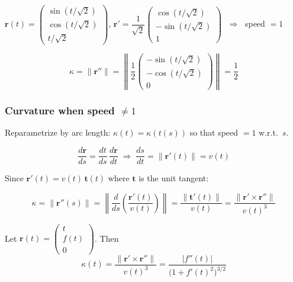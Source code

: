 \begin{example}
  $\mathbf{r}(t)
    =
    \begin{pmatrix}
      \sin(t/\!\sqrt{2}) \\ \cos(t/\!\sqrt{2}) \\ t/\!\sqrt{2}
    \end{pmatrix}
  $, \quad
  $\mathbf{r}'
    = \dfrac{1}{\sqrt{2}}
    \begin{pmatrix}
      \cos(t/\!\sqrt{2}) \\ -\sin(t/\!\sqrt{2}) \\ 1
    \end{pmatrix}
  $
  $\;\Longrightarrow\;$ speed $= 1$

  \[
    \kappa = \lVert\mathbf{r}''\rVert
    = \left\lVert \frac{1}{2}
    \begin{pmatrix}
      -\sin(t/\!\sqrt{2}) \\ -\cos(t/\!\sqrt{2}) \\ 0
    \end{pmatrix}
    \right\rVert
    = \frac{1}{2}
  \]
\end{example}

\subsubsection{Curvature when speed $\neq 1$}

Reparametrize by arc length: $\kappa(t) = \kappa(t(s))$ so that speed $= 1$ w.r.t.\ $s$.

\[
  \frac{d\mathbf{r}}{ds}
  = \frac{dt}{ds}\,\frac{d\mathbf{r}}{dt}
  \;\Longrightarrow\;
  \frac{ds}{dt} = \lVert\mathbf{r}'(t)\rVert = v(t)
\]

Since $\mathbf{r}'(t) = v(t)\,\mathbf{t}(t)$ where $\mathbf{t}$ is the unit tangent:

\[
  \kappa
  = \lVert\mathbf{r}''(s)\rVert
  = \left\lVert\frac{d}{ds}\!\left(\frac{\mathbf{r}'(t)}{v(t)}\right)\right\rVert
  = \frac{\lVert\mathbf{t}'(t)\rVert}{v(t)}
  = \boxed{\frac{\lVert\mathbf{r}'\times\mathbf{r}''\rVert}{v(t)^{3}}}
\]

\begin{example}[Curvature of $y=f(x)$]
  Let $\mathbf{r}(t) =
    \begin{pmatrix}
      t \\ f(t) \\ 0
    \end{pmatrix}
  $.
  Then
  \[
    \kappa(t)
    = \frac{\lVert\mathbf{r}'\times\mathbf{r}''\rVert}{v(t)^{3}}
    = \frac{\lvert f''(t)\rvert}{\bigl(1+f'(t)^{2}\bigr)^{3/2}}
  \]
\end{example}

